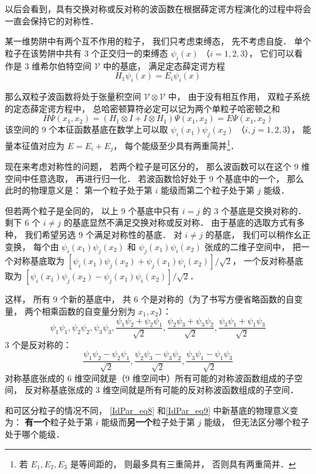 以后会看到，具有交换对称或反对称的波函数在根据薛定谔方程演化的过程中将会一直会保持它的对称性． %

\begin{example}{}
某一维势阱中有两个互不作用的粒子， 我们只考虑束缚态， 先不考虑自旋． 单个粒子在该势阱中共有 3 个正交归一的束缚态 $\psi_i(x)$ （$i=1,2,3$）， 它们可以看作是 3 维希尔伯特空间 $\mathcal V$ 中的基底， 满足定态薛定谔方程
\begin{equation}
H_1 \psi_i(x) = E_i \psi_i(x)
\end{equation}

那么双粒子波函数将处于张量积空间 $\mathcal V\otimes \mathcal V$ 中， 由于没有相互作用，  双粒子系统的定态薛定谔方程中， 总哈密顿算符必定可以记为两个单粒子哈密顿之和
\begin{equation}
H\Psi(x_1, x_2) = (H_1\otimes I + I \otimes H_1)\Psi(x_1, x_2) = E \Psi(x_1, x_2)
\end{equation}
该空间的 9 个本征函数基底在数学上可以取 $\psi_i(x_1) \psi_j(x_2)$ （$i,j=1,2,3$）， 能量本征值对应为 $E = E_i + E_j$， 每个能级至少具有两重简并\footnote{若 $E_1, E_2, E_3$ 是等间距的， 则最多具有三重简并， 否则具有两重简并．}．

现在来考虑对称性的问题， 若两个粒子是可区分的， 那么波函数可以在这个 9 维空间中任意选取， 再进行归一化． 若波函数恰好处于 9 个基底中的一个， 那么此时的物理意义是： 第一个粒子处于第 $i$ 能级而第二个粒子处于第 $j$ 能级．

但若两个粒子是全同的， 以上 9 个基底中只有 $i = j$ 的 3 个基底是交换对称的． 剩下 6 个 $i\ne j$ 的基底显然不满足交换对称或反对称． 由于基底的选取方式有多种， 我们希望另选 9 个满足对称性的基底． 对 $i\ne j$ 的基底， 我们可以稍作幺正变换， 每个由 $\psi_i(x_1)\psi_j(x_2)$ 和 $\psi_j(x_1)\psi_i(x_2)$ 张成的二维子空间中， 把一个对称基底取为 $[\psi_i(x_1) \psi_j(x_2) + \psi_j(x_1) \psi_i(x_2)]/\sqrt{2}$， 一个反对称基底取为 $[\psi_i(x_1) \psi_j(x_2) - \psi_j(x_1) \psi_i(x_2)]/\sqrt{2}$．

这样， 所有 9 个新的基底中， 共 6 个是对称的（为了书写方便省略函数的自变量， 两个相乘函数的自变量分别为 $x_1, x_2$）：
\begin{equation}\label{IdPar_eq8}
\psi_1\psi_1, \psi_2\psi_2, \psi_3\psi_3,
\frac{\psi_1\psi_2+\psi_2\psi_1}{\sqrt 2},
\frac{\psi_2\psi_3+\psi_3\psi_2}{\sqrt 2},
\frac{\psi_3\psi_1+\psi_1\psi_3}{\sqrt 2}
\end{equation}
3 个是反对称的：
\begin{equation}\label{IdPar_eq9}
\frac{\psi_1\psi_2-\psi_2\psi_1}{\sqrt 2},
\frac{\psi_2\psi_3-\psi_3\psi_2}{\sqrt 2},
\frac{\psi_3\psi_1-\psi_1\psi_3}{\sqrt 2}
\end{equation}
对称基底张成的 6 维空间就是（9 维空间中）所有可能的对称波函数组成的子空间， 反对称基底张成的 3 维空间就是所有可能的反对称波函数组成的子空间．

和可区分粒子的情况不同， \autoref{IdPar_eq8} 和\autoref{IdPar_eq9} 中新基底的物理意义变为： \textbf{有一个}粒子处于第 $i$ 能级而\textbf{另一个}粒子处于第 $j$ 能级， 但无法区分哪个粒子处于哪个能级．
\end{example}

